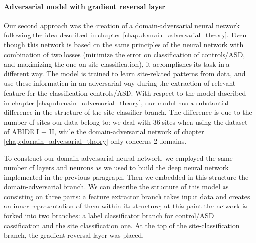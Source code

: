 \documentclass[11pt]{report}
\begin{document}
\paragraph{Adversarial model with gradient reversal layer}\hfill

\noindent Our second approach was the creation of a domain-adversarial neural network following the idea described in chapter \ref{chap:domain_adversarial_theory}.
Even though this network is based on the same principles of the neural network with combination of two losses (minimize the error on classification of controls/ASD, and maximizing the one on site classification), it accomplishes its task in a different way.
The model is trained to learn site-related patterns from data, and use these information in an adversarial way during the extraction of relevant feature for the classification controls/ASD.
With respect to the model described in chapter \ref{chap:domain_adversarial_theory}, our model has a substantial difference in the structure of the site-classifier branch.
The difference is due to the number of sites our data belong to: we deal with 36 sites when using the dataset of ABIDE I + II, while the domain-adversarial network of chapter \ref{chap:domain_adversarial_theory} only concerns 2 domains.


To construct our domain-adversarial neural network, we employed the same number of layers and neurons as we used to build the deep neural network implemented in the previous paragraph.
Then we embedded in this structure the domain-adversarial branch.
We can describe the structure of this model as consisting on three parts: a feature extractor branch takes input data and creates an inner representation of them within its structure; at this point the network is forked into two branches: a label classificator branch for control/ASD cassification and the site classification one.
At the top of the site-classification branch, the gradient reversal layer was placed.
\end{document}

